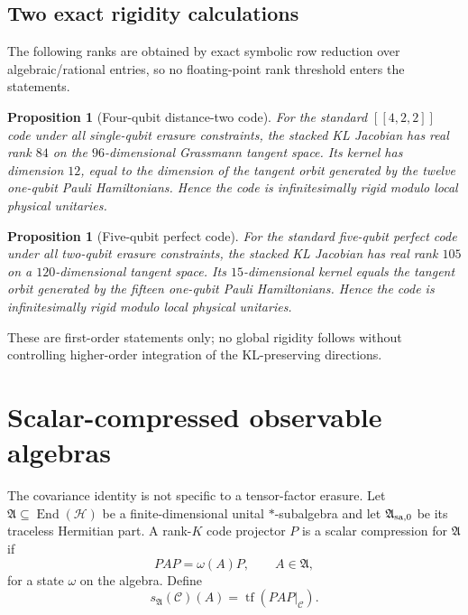 \documentclass[11pt]{article}
\newtheorem{proposition}[theorem]{Proposition}
\theoremstyle{definition}
\newcommand{\cH}{\mathcal H}
\newcommand{\cC}{\mathcal C}
\newcommand{\tf}{\operatorname{tf}}
\begin{document}
\subsection{Two exact rigidity calculations}
The following ranks are obtained by exact symbolic row reduction over algebraic/rational entries, so no floating-point rank threshold enters the statements.

\begin{proposition}[Four-qubit distance-two code]
For the standard $[[4,2,2]]$ code under all single-qubit erasure constraints, the stacked KL Jacobian has real rank $84$ on the $96$-dimensional Grassmann tangent space. Its kernel has dimension $12$, equal to the dimension of the tangent orbit generated by the twelve one-qubit Pauli Hamiltonians. Hence the code is infinitesimally rigid modulo local physical unitaries.
\end{proposition}

\begin{proposition}[Five-qubit perfect code]
For the standard five-qubit perfect code under all two-qubit erasure constraints, the stacked KL Jacobian has real rank $105$ on a $120$-dimensional tangent space. Its $15$-dimensional kernel equals the tangent orbit generated by the fifteen one-qubit Pauli Hamiltonians. Hence the code is infinitesimally rigid modulo local physical unitaries.
\end{proposition}

These are first-order statements only; no global rigidity follows without controlling higher-order integration of the KL-preserving directions.

\section{Scalar-compressed observable algebras}
The covariance identity is not specific to a tensor-factor erasure. Let $\mathfrak A\subseteq\operatorname{End}(\cH)$ be a finite-dimensional unital $*$-subalgebra and let $\mathfrak A_{\rm sa,0}$ be its traceless Hermitian part. A rank-$K$ code projector $P$ is a scalar compression for $\mathfrak A$ if
\[
PAP=\omega(A)P,\qquad A\in\mathfrak A,
\]
for a state $\omega$ on the algebra. Define
\[
s_{\mathfrak A}(\cC)(A)=\tf(PAP|_{\cC}).
\]
\end{document}
